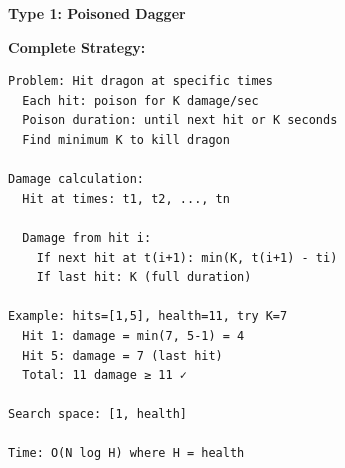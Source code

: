 \documentclass[11pt,a4paper,oneside]{book}
\begin{document}
\begin{tcolorbox}[
    enhanced,breakable,
    colback=warnyellow!10,
    colframe=warnyellow,
    boxrule=2pt,
    arc=4mm,
    title=\textbf{Complete Time Interval Algorithms}
]
\textbf{Type 1: Poisoned Dagger}

\textbf{Complete Strategy:}
\begin{verbatim}
Problem: Hit dragon at specific times
  Each hit: poison for K damage/sec
  Poison duration: until next hit or K seconds
  Find minimum K to kill dragon

Damage calculation:
  Hit at times: t1, t2, ..., tn
  
  Damage from hit i:
    If next hit at t(i+1): min(K, t(i+1) - ti)
    If last hit: K (full duration)

Example: hits=[1,5], health=11, try K=7
  Hit 1: damage = min(7, 5-1) = 4
  Hit 5: damage = 7 (last hit)
  Total: 11 damage ≥ 11 ✓

Search space: [1, health]

Time: O(N log H) where H = health
\end{verbatim}
\end{tcolorbox}
\end{document}
